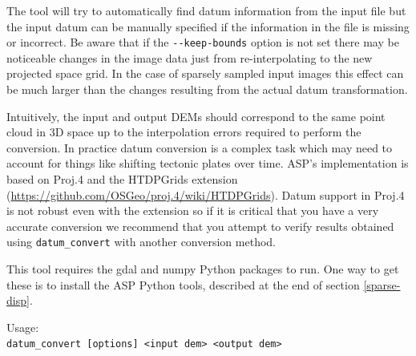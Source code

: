 The tool will try to automatically find
datum information from the input file but the input datum can be manually specified
if the information in the file is missing or incorrect.  Be aware that if the 
\texttt{-\/-keep-bounds} option is not set there may be noticeable changes in
the image data just from re-interpolating to the new projected space grid.  In
the case of sparsely sampled input images this effect can be much larger than the
changes resulting from the actual datum transformation.

Intuitively, the input and output DEMs should correspond to the same
point cloud in 3D space up to the interpolation errors required to
perform the conversion.  In practice datum conversion is a complex
task which may need to account for things like shifting tectonic plates 
over time.  ASP's implementation is based on Proj.4 and the HTDPGrids
extension (\url{https://github.com/OSGeo/proj.4/wiki/HTDPGrids}).
Datum support in Proj.4 is not robust even with the extension so if it is 
critical that you have a very accurate conversion we recommend that you attempt 
to verify results obtained using \texttt{datum\_convert} with another conversion method.

This tool requires the gdal and numpy Python packages to run.  One way to get these is 
to install the ASP Python tools, described at the end of section \ref{sparse-disp}.

\medskip
Usage:\\
\hspace*{2em}\texttt{datum\_convert [options] <input dem> <output dem>}
\medskip

